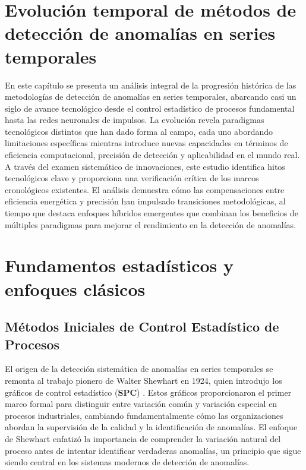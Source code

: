 \section{Evolución temporal de métodos de detección de anomalías en series temporales}
En este capítulo se presenta un análisis integral de la progresión histórica de las metodologías de detección de anomalías en series temporales, abarcando casi un siglo de avance tecnológico desde el control estadístico de procesos fundamental hasta las redes neuronales de impulsos. La evolución revela paradigmas tecnológicos distintos que han dado forma al campo, cada uno abordando limitaciones específicas mientras introduce nuevas capacidades en términos de eficiencia computacional, precisión de detección y aplicabilidad en el mundo real. A través del examen sistemático de innovaciones, este estudio identifica hitos tecnológicos clave y proporciona una verificación crítica de los marcos cronológicos existentes. El análisis demuestra cómo las compensaciones entre eficiencia energética y precisión han impulsado transiciones metodológicas, al tiempo que destaca enfoques híbridos emergentes que combinan los beneficios de múltiples paradigmas para mejorar el rendimiento en la detección de anomalías.

\section{Fundamentos estadísticos y enfoques clásicos}
\subsection{Métodos Iniciales de Control Estadístico de Procesos}

El origen de la detección sistemática de anomalías en series temporales se remonta al trabajo pionero de Walter Shewhart en 1924, quien introdujo los gráficos de control estadístico (\textbf{SPC}) \cite{shewhart_economic_1931}. Estos gráficos proporcionaron el primer marco formal para distinguir entre variación común y variación especial en procesos industriales, cambiando fundamentalmente cómo las organizaciones abordan la supervisión de la calidad y la identificación de anomalías. El enfoque de Shewhart enfatizó la importancia de comprender la variación natural del proceso antes de intentar identificar verdaderas anomalías, un principio que sigue siendo central en los sistemas modernos de detección de anomalías.

